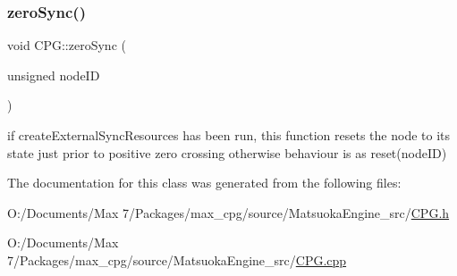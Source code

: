 \mbox{\label{classCPG_adb0ab0506c07d1b7aa9dd2640c6a1731}} 
\subsubsection{\texorpdfstring{zero\+Sync()}{zeroSync()}}
{\footnotesize\ttfamily void C\+P\+G\+::zero\+Sync (\begin{DoxyParamCaption}\item[{unsigned}]{node\+ID }\end{DoxyParamCaption})}

if create\+External\+Sync\+Resources has been run, this function resets the node to its state just prior to positive zero crossing otherwise behaviour is as reset(node\+I\+D) 

The documentation for this class was generated from the following files\+:\begin{DoxyCompactItemize}
\item 
O\+:/\+Documents/\+Max 7/\+Packages/max\+\_\+cpg/source/\+Matsuoka\+Engine\+\_\+src/\mbox{\hyperlink{CPG_8h}{C\+P\+G.\+h}}\item 
O\+:/\+Documents/\+Max 7/\+Packages/max\+\_\+cpg/source/\+Matsuoka\+Engine\+\_\+src/\mbox{\hyperlink{CPG_8cpp}{C\+P\+G.\+cpp}}\end{DoxyCompactItemize}
